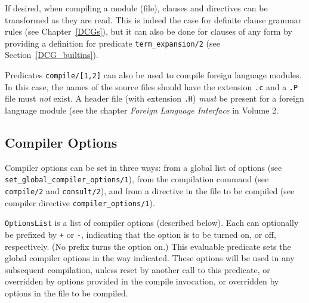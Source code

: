 If desired, when compiling a module (file), clauses and directives can be
transformed as they are read.  This is indeed the case for definite clause
grammar rules (see Chapter~\ref{DCGs}), but it can also be done for clauses
of any form by providing a definition for predicate {\tt term\_expansion/2}
(see Section~\ref{DCG_builtins}).

Predicates {\tt compile/[1,2]} can also be used to compile foreign
language modules.  In this case, the names of the source files should
have the extension {\tt .c} and a {\tt .P} file must {\em not\/}
exist.  A header file (with extension {\tt .H}) {\em must} be present
for a foreign language module (see the chapter {\it Foreign Language
Interface} in Volume 2.


\subsection{Compiler Options}\label{compiler_options}

Compiler options can be set in three ways: from a global list of
options (see {\tt set\_global\_compiler\_options/1}), from the
compilation command (see {\tt compile/2} and {\tt consult/2}), and
from a directive in the file to be compiled (see compiler directive
{\tt compiler\_options/1}).

\begin{description}
    {\tt OptionsList} is a list of compiler options (described below).
    Each can optionally be prefixed by \verb|+| or \verb|-|,
    indicating that the option is to be turned on, or off,
    respectively.  (No prefix turns the option on.)  This evaluable
    predicate sets the global compiler options in the way indicated.
    These options will be used in any subsequent compilation, unless
    reset by another call to this predicate, or overridden by options
    provided in the compile invocation, or overridden by options in
    the file to be compiled.
\end{description}

